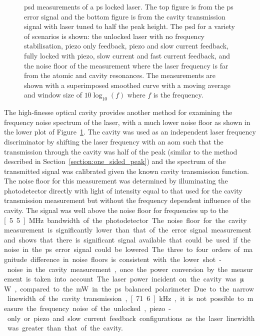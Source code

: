 \begin{figure}
\center

\caption[Laser frequency noise power spectral density from polarisation spectroscopy error signal and cavity transmission for a polarisation spectroscopy locked laser.]{\Gls{psd} measurements of a \gls{ps} locked laser.
The top figure is from the \gls{ps} error signal and the bottom figure is from the cavity transmission signal with laser tuned to half the peak height.
The \gls{psd} for a variety of scenarios is shown: the unlocked laser with no frequency stabilisation, piezo only feedback, piezo and slow current feedback, fully locked with piezo, slow current and fast current feedback, and the noise floor of the measurement where the laser frequency is far from the atomic and cavity resonances.
The measurements are shown with a superimposed smoothed curve with a moving average and window size of $10\log_{10}(f)$ where $f$ is the frequency.}
\label{figure:psd}
\end{figure}

The high-finesse optical cavity provides another method for examining the frequency noise spectrum of the laser, with a much lower noise floor as shown in the lower plot of Figure~\ref{figure:psd}.
The cavity was used as an independent laser frequency discriminator by shifting the laser frequency with an \gls{aom} such that the transmission through the cavity was half of the peak (similar to the method described in Section~\ref{section:one_sided_peak}) and the spectrum of the transmitted signal was calibrated given the known cavity transmission function.
The noise floor for this measurement was determined by illuminating the photodetector directly with light of intensity equal to that used for the cavity transmission measurement but without the frequency dependent influence of the cavity.
The signal was well above the noise floor for frequencies up to the \unit[5.5]{MHz} bandwidth of the photodetector.
The noise floor for the cavity measurement is significantly lower than that of the error signal measurement and shows that there is significant signal available that could be used if the noise in the \gls{ps} error signal could be lowered.
The three to four orders of magnitude difference in noise floors is consistent with the lower shot-noise in the cavity measurement, once the power conversion by the measurement is taken into account.
The laser power incident on the cavity was \unit[10]{$\muup$W}, compared to the \unit[1]{mW} in the \gls{ps} balanced polarimeter.
Due to the narrow linewidth of the cavity transmission, \unit[71.6]{kHz}, it is not possible to measure the frequency noise of the unlocked, piezo-only or piezo and slow current feedback configurations as the laser linewidth was greater than that of the cavity.

